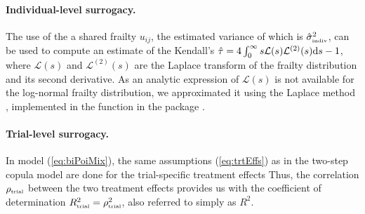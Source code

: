 \documentclass[article,shortnames, nojss]{jss}\usepackage[]{graphicx}\usepackage[]{color}
\begin{document}
\paragraph{Individual-level surrogacy.}
The use of the a shared frailty $u_{ij}$,
the estimated variance of which  is $\hat\sigma^2_\text{\tiny indiv}$,
can be used to compute an estimate of the Kendall's
$\hat\tau = 4 \int_0^\infty s \mathcal L(s)\mathcal L^{(2)}(s) \textrm d s - 1$,
where $\mathcal L(s)$ and $\mathcal L^{(2)}(s)$
are the Laplace transform of the frailty distribution and its
second derivative.
As an analytic expression of $\mathcal L(s)$
is not available for the log-normal frailty distribution,
we approximated it using the Laplace method \citep{GoutisCasella99},
implemented in the  function
in the  package \citep{parfmJSS, R:parfm}.


\paragraph{Trial-level surrogacy.} \label{sec:trialDep}
In model (\ref{eq:biPoiMix}),
the same assumptions (\ref{eq:trtEffs})
as in the two-step copula model
are done for the trial-specific treatment effects
Thus, the correlation $\rho_\text{\tiny trial}$
between the two treatment effects provides us with 
the coefficient of determination
$R^2_\text{\tiny trial} = \rho^2_\text{\tiny trial}$,
also referred to simply as $R^2$.


\end{document}
